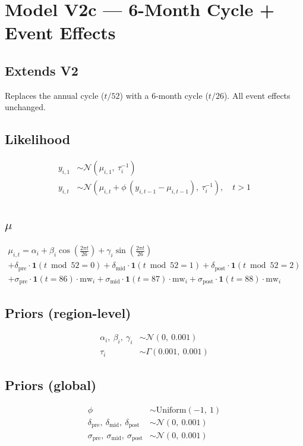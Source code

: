\documentclass{article}
\begin{document}
\section*{Model V2c --- 6-Month Cycle + Event Effects}

\subsection*{Extends V2}

Replaces the annual cycle ($t/52$) with a 6-month cycle ($t/26$). All event effects unchanged.

\subsection*{Likelihood}

\begin{align}
  y_{i,1} &\sim \mathcal{N}(\mu_{i,1},\ \tau_i^{-1}) \\[6pt]
  y_{i,t} &\sim \mathcal{N}\left(\mu_{i,t} + \phi\,(y_{i,t-1} - \mu_{i,t-1}),\ \tau_i^{-1}\right), \quad t > 1
\end{align}

\subsection*{$\mu$}

\begin{multline}
  \mu_{i,t} = \alpha_i
    + \beta_i \cos\left(\tfrac{2\pi t}{26}\right)
    + \gamma_i \sin\left(\tfrac{2\pi t}{26}\right) \\
    + \delta_{\text{pre}} \cdot \mathbf{1}(t \bmod 52 = 0)
    + \delta_{\text{mid}} \cdot \mathbf{1}(t \bmod 52 = 1)
    + \delta_{\text{post}} \cdot \mathbf{1}(t \bmod 52 = 2) \\
    + \sigma_{\text{pre}} \cdot \mathbf{1}(t = 86) \cdot \mathrm{mw}_i
    + \sigma_{\text{mid}} \cdot \mathbf{1}(t = 87) \cdot \mathrm{mw}_i
    + \sigma_{\text{post}} \cdot \mathbf{1}(t = 88) \cdot \mathrm{mw}_i
\end{multline}

\subsection*{Priors (region-level)}

\begin{align}
  \alpha_i,\ \beta_i,\ \gamma_i &\sim \mathcal{N}(0,\ 0.001) \\
  \tau_i &\sim \Gamma(0.001,\ 0.001)
\end{align}

\subsection*{Priors (global)}

\begin{align}
  \phi &\sim \mathrm{Uniform}(-1,\ 1) \\
  \delta_{\text{pre}},\ \delta_{\text{mid}},\ \delta_{\text{post}} &\sim \mathcal{N}(0,\ 0.001) \\
  \sigma_{\text{pre}},\ \sigma_{\text{mid}},\ \sigma_{\text{post}} &\sim \mathcal{N}(0,\ 0.001)
\end{align}
\end{document}
